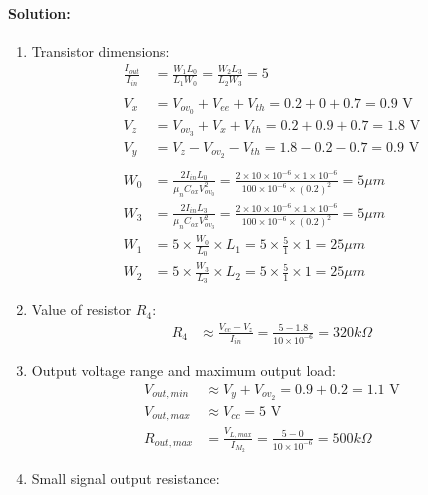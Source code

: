 \paragraph{Solution:}
\begin{enumerate}
  \item Transistor dimensions:
    \begin{align*}
      \frac{I_{out}}{I_{in}} &= \frac{W_1 L_0}{L_1 W_0} = \frac{W_2 L_3}{L_2 W_3} = 5 \\
      \\
      V_{x} &= V_{ov_0} + V_{ee} + V_{th} = 0.2 + 0 + 0.7 = 0.9 \text{ V} \\
      V_{z} &= V_{ov_3} + V_{x} + V_{th} = 0.2 + 0.9 + 0.7 = 1.8 \text{ V} \\
      V_{y} &= V_{z} - V_{ov_2} - V_{th} = 1.8 - 0.2 - 0.7 = 0.9 \text{ V} \\
      \\
      W_0 &= \frac{2 I_{in} L_0}{\mu_n C_{ox} V_{ov_0}^2} = \frac{2 \times 10 \times 10^{-6} \times 1 \times 10^{-6}}{100 \times 10^{-6} \times (0.2)^2} = 5 \mu m \\
      W_3 &= \frac{2 I_{in} L_3}{\mu_n C_{ox} V_{ov_3}^2} = \frac{2 \times 10 \times 10^{-6} \times 1 \times 10^{-6}}{100 \times 10^{-6} \times (0.2)^2} = 5 \mu m \\
      W_1 &= 5 \times \frac{W_0}{L_0} \times L_1 = 5 \times \frac{5}{1} \times 1 = 25 \mu m \\
      W_2 &= 5 \times \frac{W_3}{L_3} \times L_2 = 5 \times \frac{5}{1} \times 1 = 25 \mu m
    \end{align*}
  \item Value of resistor $R_4$:
    \begin{align*}
      R_4 &\approx \frac{V_{cc} - V_{z}}
                      {I_{in}} = \frac{5 - 1.8}{10 \times 10^{-6}} = 320 k\Omega
    \end{align*}
  \item Output voltage range and maximum output load:
    \begin{align*}
      V_{out, min} &\approx V_{y} + V_{ov_2} = 0.9 + 0.2 = 1.1 \text{ V} \\
      V_{out, max} &\approx V_{cc} = 5 \text{ V} \\
      R_{out, max} &= \frac{V_{L, max}}{I_{M_2}} = \frac{5 - 0}{10 \times 10^{-6}} = 500 k\Omega
    \end{align*}
  \item Small signal output resistance:
    \begin{align*}

\end{align*}
\end{enumerate}
